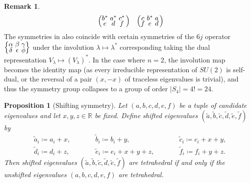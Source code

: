 \documentclass[notitlepage, 11pt, letterpaper]{amsart}
\makeatletter
\theoremstyle{plain}
\newtheorem{prop}[thm]{Proposition}
\theoremstyle{definition}
\newtheorem{rem}[thm]{Remark}%
\let\cref\crtcref
\newcommand{\abs}[1]{\left|#1\right|}
\newcommand{\ea}{a}
\newcommand{\eb}{b}
\newcommand{\ec}{c}
\newcommand{\ed}{d}
\newcommand{\ee}{e}
\newcommand{\ef}{f}
\newcommand{\yx}{\lambda}
\newcommand{\tightsextuple}[1]{
\begingroup
\arraycolsep=1.5pt
\renewcommand{\arraystretch}{0.3}
\begin{array}{@{}cccccc@{}}#1\end{array}
\endgroup
}
\newcommand{\tightcurlysixj}[1]{
\begingroup
\arraycolsep=1.5pt
\renewcommand{\arraystretch}{0.3}
\left\{\!\begin{array}{ccc}
    #1
\end{array}\!\right\}
\endgroup
}
\newcommand{\abcdefsymbol}{\tightcurlysixj{\alpha & \beta & \gamma \\ \delta & \epsilon & \phi}}
\makeatother
\begin{document}
\begin{rem}
\begin{equation}
\begin{alignedat}{3}
            \quad
            &&\left(\tightsextuple{\eb^* & \ea^*  & \ec^* \\ \ee & \ed & \ef}\right)
            \quad
            &&\left(\tightsextuple{\ec & \eb^* & \ea \\ \ef & \ee & \ed}\right)\\
        \end{alignedat}
    \end{equation}
    The symmetries in \cref{prop:tet_symmetry} also coincide with certain symmetries of the $6j$ operator $\abcdefsymbol$ under the involution $\yx \mapsto \yx^{*}$ corresponding taking the dual representation $V_{\yx} \mapsto (V_{\yx})^{*}$.
    In the case where $n = 2$, the involution map becomes the identity map (as every irreducible representation of $SU(2)$ is self-dual, or the reversal of a pair $(x,-x)$ of traceless eigenvalues is trivial), and thus the symmetry group collapses to a group of order $\abs{S_4} = 4! = 24$.
\end{rem}
\begin{prop}[Shifting symmetry]
    \label{prop:shifting}
    Let $(\ea, \eb, \ec, \ed, \ee, \ef)$ be a tuple of candidate eigenvalues and let $x,y,z \in \mathbb R$ be fixed.
    Define shifted eigenvalues $(\tilde \ea, \tilde \eb, \tilde \ec, \tilde \ed, \tilde \ee,\tilde \ef)$ by
    \begin{equation}
        \label{eq:shifted_tet_eigenvalues}
        \begin{alignedat}{3}
             &\tilde \ea_i \coloneqq \ea_i + x, \qquad
            &&\tilde \eb_i \coloneqq \eb_i + y, \qquad
            &&\tilde \ec_i \coloneqq \ec_i + x + y, \\
             &\tilde \ed_i \coloneqq \ed_i + z, \qquad
            &&\tilde \ee_i \coloneqq \ee_i + x + y + z, \qquad
            &&\tilde \ef_i \coloneqq \ef_i + y + z.
        \end{alignedat}
    \end{equation}
    Then shifted eigenvalues $(\tilde \ea, \tilde \eb, \tilde \ec, \tilde \ed, \tilde \ee,\tilde \ef)$ are tetrahedral if and only if the unshifted eigenvalues $(\ea, \eb, \ec, \ed, \ee, \ef)$ are tetrahedral.
\end{prop}
\end{document}
